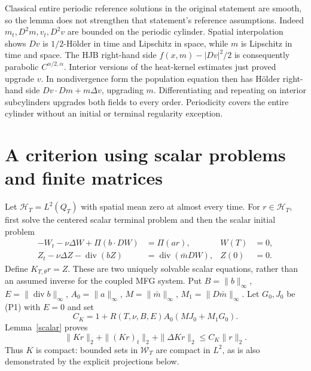 \documentclass[11pt,a4paper]{article}
\begin{document}
Classical entire periodic reference solutions in the original statement
are smooth, so the lemma does not strengthen that statement's reference
assumptions. Indeed $m_t,D^2m,v_t,D^2v$ are bounded on the periodic
cylinder. Spatial interpolation shows $Dv$ is $1/2$-H\"older in time
and Lipschitz in space, while $m$ is Lipschitz in time and space.
The HJB right-hand side $f(x,m)-|Dv|^2/2$ is consequently parabolic
$C^{\alpha/2,\alpha}$. Interior versions of the heat-kernel estimates
just proved upgrade $v$. In nondivergence form the population equation
then has H\"older right-hand side $Dv\cdot Dm+m\Delta v$, upgrading
$m$. Differentiating and repeating on interior subcylinders upgrades
both fields to every order. Periodicity covers the entire cylinder
without an initial or terminal regularity exception.

\section{A criterion using scalar problems and finite matrices}
Let $\mathcal H_T=L^2(Q_T)$ with spatial mean zero at almost every time.
For $r\in\mathcal H_T$, first solve the centered scalar terminal problem
and then the scalar initial problem
\begin{equation}\tag{K1}\label{K1}
 \begin{aligned}
 -W_t-\nu\Delta W+\Pi(b\cdot DW)&=\Pi(ar),& W(T)&=0,\\
 Z_t-\nu\Delta Z-\operatorname{div}(bZ)
                         &=\operatorname{div}(\bar m DW),& Z(0)&=0.
 \end{aligned}
\end{equation}
Define $K_{T,\theta}r=Z$. These are two uniquely solvable scalar
equations, rather than an assumed inverse for the coupled MFG system.
Put $B=\|b\|_\infty$, $E=\|\operatorname{div}b\|_\infty$,
$A_0=\|a\|_\infty$, $M=\|\bar m\|_\infty$,
$M_1=\|D\bar m\|_\infty$. Let $G_0,J_0$ be (P1) with $E=0$ and set
\begin{equation}\tag{K2}\label{K2}
 C_K=1+R(T,\nu,B,E)A_0(MJ_0+M_1G_0).
\end{equation}
Lemma~\ref{scalar} proves
\[
 \|Kr\|_2+\|(Kr)_t\|_2+\|\Delta Kr\|_2\leq C_K\|r\|_2.
\]
Thus $K$ is compact: bounded sets in $\mathcal W_T$ are compact in
$L^2$, as is also demonstrated by the explicit projections below.
\end{document}
